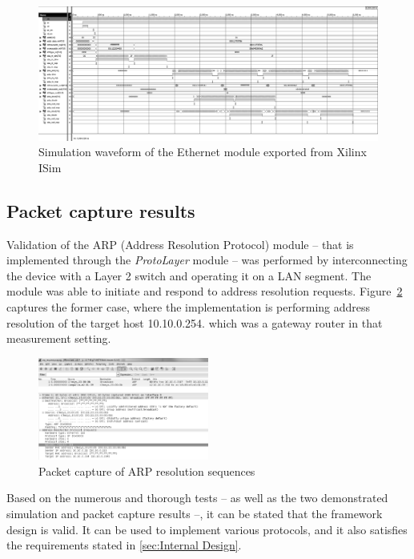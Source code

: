 \documentclass[conference]{IEEEtran}
\begin{document}
\begin{figure}[!htb]
    \centering
    \includegraphics[width=1\textwidth]{figures_raw/ether_tst_wave.png}
    \caption{Simulation waveform of the Ethernet module exported from Xilinx ISim}
    \label{fig:eth_sim}
\end{figure}

\subsection{Packet capture results}

Validation of the ARP (Address Resolution Protocol) module -- that is implemented through the \emph{ProtoLayer} module -- was performed by interconnecting the device with a Layer 2 switch and operating it on a LAN segment. The module was able to initiate and respond to address resolution requests. Figure~\ref{fig:pcap_arp_seq} captures the former case, where the implementation is performing address resolution of the target host 10.10.0.254. which was a gateway router in that measurement setting.

\begin{figure}[!htb]
    \centering
    \includegraphics[width=0.5\textwidth]{figures_raw/arp_transaction.png}
    \caption{Packet capture of ARP resolution sequences}
    \label{fig:pcap_arp_seq}
\end{figure}

Based on the numerous and thorough tests -- as well as the two demonstrated simulation and packet capture results --, it can be stated that the framework design is valid. It can be used to implement various protocols, and it also satisfies the requirements stated in \ref{sec:Internal Design}.
\end{document}
